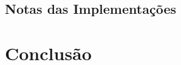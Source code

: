 \documentclass[12pt,a4paper,oneside]{article}
\begin{document}
\subsection{Notas das Implementações}

\lipsum[1]

\lipsum[2]


\section{Conclusão}
\label{sec:conc}

\lipsum[1]

\lipsum[2]



\end{document}
